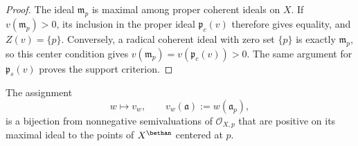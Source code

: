 \begin{proof}
The ideal $\mathfrak m_p$ is maximal among proper coherent
ideals on $X$. If $v(\mathfrak m_p)>0$, its inclusion in the
proper ideal $\mathfrak p_c(v)$ therefore gives equality, and
$Z(v)=\{p\}$. Conversely, a radical coherent ideal with zero
set $\{p\}$ is exactly $\mathfrak m_p$, so this center condition
gives $v(\mathfrak m_p)=v(\mathfrak p_c(v))>0$.
The same argument for $\mathfrak p_s(v)$ proves the support criterion.
\end{proof}

\begin{proposition}\label{prop:ts-local-global-point}
The assignment
\[
 w\longmapsto v_w,\qquad
 v_w(\mathfrak a):=w(\mathfrak a_p),
\]
is a bijection from nonnegative semivaluations of
$\mathcal O_{X,p}$ that are positive on its maximal ideal to
the points of $X^\bethan$ centered at $p$.
\end{proposition}

